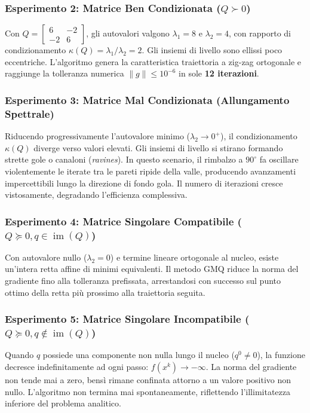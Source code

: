 \subsubsection{Esperimento 2: Matrice Ben Condizionata ($Q \succ 0$)}
Con $Q = \begin{bmatrix} 6 & -2 \\ -2 & 6 \end{bmatrix}$, gli autovalori valgono $\lambda_1 = 8$ e $\lambda_2 = 4$, con rapporto di condizionamento $\kappa(Q) = \lambda_1 / \lambda_2 = 2$.
Gli insiemi di livello sono ellissi poco eccentriche. L'algoritmo genera la caratteristica traiettoria a zig-zag ortogonale e raggiunge la tolleranza numerica $\|g\| \le 10^{-6}$ in sole \textbf{12 iterazioni}.

\subsubsection{Esperimento 3: Matrice Mal Condizionata (Allungamento Spettrale)}
Riducendo progressivamente l'autovalore minimo ($\lambda_2 \to 0^+$), il condizionamento $\kappa(Q)$ diverge verso valori elevati. Gli insiemi di livello si stirano formando strette gole o canaloni (\textit{ravines}).
In questo scenario, il rimbalzo a $90^\circ$ fa oscillare violentemente le iterate tra le pareti ripide della valle, producendo avanzamenti impercettibili lungo la direzione di fondo gola. Il numero di iterazioni cresce vistosamente, degradando l'efficienza complessiva.

\subsubsection{Esperimento 4: Matrice Singolare Compatibile ($Q \succeq 0, q \in \operatorname{im}(Q)$)}
Con autovalore nullo ($\lambda_2 = 0$) e termine lineare ortogonale al nucleo, esiste un'intera retta affine di minimi equivalenti. Il metodo GMQ riduce la norma del gradiente fino alla tolleranza prefissata, arrestandosi con successo sul punto ottimo della retta pi\`u prossimo alla traiettoria seguita.

\subsubsection{Esperimento 5: Matrice Singolare Incompatibile ($Q \succeq 0, q \notin \operatorname{im}(Q)$)}
Quando $q$ possiede una componente non nulla lungo il nucleo ($q^0 \neq 0$), la funzione decresce indefinitamente ad ogni passo: $f(x^k) \to -\infty$. La norma del gradiente non tende mai a zero, bens\`i rimane confinata attorno a un valore positivo non nullo. L'algoritmo non termina mai spontaneamente, riflettendo l'illimitatezza inferiore del problema analitico.

